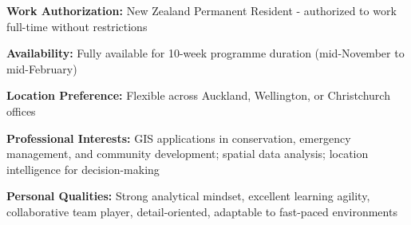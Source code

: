 \documentclass[11pt, a4paper]{awesome-cv}
\begin{document}
\begin{cvitems}
  \item {\textbf{Work Authorization:} New Zealand Permanent Resident - authorized to work full-time without restrictions}
  \item {\textbf{Availability:} Fully available for 10-week programme duration (mid-November to mid-February)}
  \item {\textbf{Location Preference:} Flexible across Auckland, Wellington, or Christchurch offices}
  \item {\textbf{Professional Interests:} GIS applications in conservation, emergency management, and community development; spatial data analysis; location intelligence for decision-making}
  \item {\textbf{Personal Qualities:} Strong analytical mindset, excellent learning agility, collaborative team player, detail-oriented, adaptable to fast-paced environments}
\end{cvitems}
\end{document}
